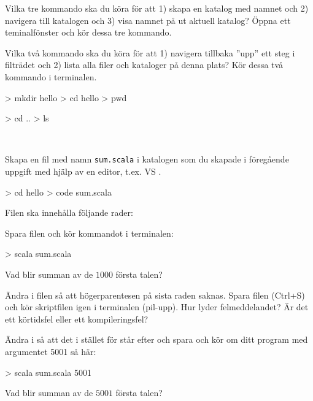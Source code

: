 \Subtask Vilka tre kommando ska du köra för att 1) skapa en katalog med namnet  och 2)  navigera till katalogen och 3) visa namnet på ut aktuell katalog? Öppna ett teminalfönster och kör dessa tre kommando.

\Subtask Vilka två kommando ska du köra för att 1) navigera tillbaka ''upp'' ett steg i filträdet och 2) lista alla filer och kataloger på denna plats? Kör dessa två kommando i terminalen.

\SOLUTION

\TaskSolved \what

\SubtaskSolved

\begin{REPL}
> mkdir hello
> cd hello
> pwd
\end{REPL}

\SubtaskSolved

\begin{REPL}
> cd ..
> ls
\end{REPL}


\QUESTEND










\QUESTBEGIN

\Task  \what~

\Subtask Skapa en fil med namn \texttt{sum.scala} i katalogen  som du skapade i föregående uppgift med hjälp av en editor, t.ex. VS .
\begin{REPLnonum}
> cd hello
> code sum.scala
\end{REPLnonum}

\noindent Filen ska innehålla följande rader:

\noindent Spara filen och kör kommandot  i terminalen:
\begin{REPLnonum}
> scala sum.scala
\end{REPLnonum}

\noindent Vad blir summan av de $1000$ första talen?

\Subtask Ändra i filen  så att högerparentesen på sista raden saknas. Spara filen (Ctrl+S) och kör skriptfilen igen i terminalen (pil-upp). Hur lyder felmeddelandet? Är det ett körtidsfel eller ett kompileringsfel?

\Subtask Ändra i  så att det i stället för  står  efter  och spara och kör om ditt program med argumentet 5001 så här:
\begin{REPL}
> scala sum.scala 5001
\end{REPL}
\noindent Vad blir summan av de $5001$ första talen?

